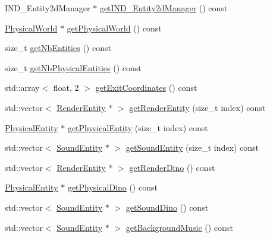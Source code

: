 \begin{DoxyCompactItemize}
\item 
I\-N\-D\-\_\-\-Entity2d\-Manager $\ast$ \hyperlink{class_symp_1_1_entity_manager_aa1babaa1b11f1a0bcdcf5d7c1fe1d3d9}{get\-I\-N\-D\-\_\-\-Entity2d\-Manager} () const 
\item 
\hyperlink{class_symp_1_1_physical_world}{Physical\-World} $\ast$ \hyperlink{class_symp_1_1_entity_manager_afc649b64f5851802facf34afb1dff150}{get\-Physical\-World} () const 
\item 
size\-\_\-t \hyperlink{class_symp_1_1_entity_manager_adafba7ec7121cfd1e7f187e027b8ed3d}{get\-Nb\-Entities} () const 
\item 
size\-\_\-t \hyperlink{class_symp_1_1_entity_manager_a19b90189de9bb0cf8111eda5ec705b6c}{get\-Nb\-Physical\-Entities} () const 
\item 
std\-::array$<$ float, 2 $>$ \hyperlink{class_symp_1_1_entity_manager_af3cea4bd58d629124c47f851174b7334}{get\-Exit\-Coordinates} () const 
\item 
std\-::vector$<$ \hyperlink{class_symp_1_1_render_entity}{Render\-Entity} $\ast$ $>$ \hyperlink{class_symp_1_1_entity_manager_a21aa2e05e4bd2d526306e173c5ca2381}{get\-Render\-Entity} (size\-\_\-t index) const 
\item 
\hyperlink{class_symp_1_1_physical_entity}{Physical\-Entity} $\ast$ \hyperlink{class_symp_1_1_entity_manager_a11ac1efae3f8651994f01ce9df305393}{get\-Physical\-Entity} (size\-\_\-t index) const 
\item 
std\-::vector$<$ \hyperlink{class_symp_1_1_sound_entity}{Sound\-Entity} $\ast$ $>$ \hyperlink{class_symp_1_1_entity_manager_a95ce86f8088b0ebf5b8d19f427d588ac}{get\-Sound\-Entity} (size\-\_\-t index) const 
\item 
std\-::vector$<$ \hyperlink{class_symp_1_1_render_entity}{Render\-Entity} $\ast$ $>$ \hyperlink{class_symp_1_1_entity_manager_ac1dfb6cba31d95ec8369e7dbb54eac1b}{get\-Render\-Dino} () const 
\item 
\hyperlink{class_symp_1_1_physical_entity}{Physical\-Entity} $\ast$ \hyperlink{class_symp_1_1_entity_manager_a813a586c35f339bf57db018191d893ce}{get\-Physical\-Dino} () const 
\item 
std\-::vector$<$ \hyperlink{class_symp_1_1_sound_entity}{Sound\-Entity} $\ast$ $>$ \hyperlink{class_symp_1_1_entity_manager_a11d90dba29177f8c6c5b597116d4949e}{get\-Sound\-Dino} () const 
\item 
std\-::vector$<$ \hyperlink{class_symp_1_1_sound_entity}{Sound\-Entity} $\ast$ $>$ \hyperlink{class_symp_1_1_entity_manager_ad2edee31add8a9c10d1db16b5d5452fe}{get\-Background\-Music} () const 

\end{DoxyCompactItemize}
